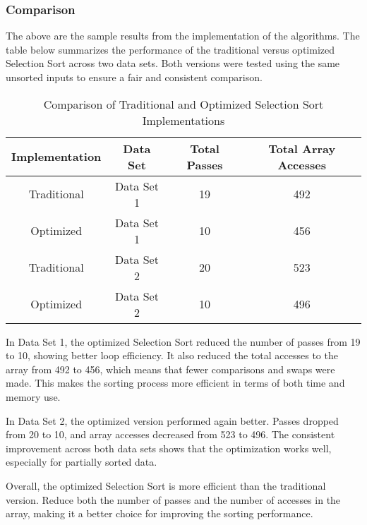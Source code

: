 \subsubsection{Comparison}


The above are the sample results from the implementation of the algorithms. The table below summarizes the performance of the traditional versus optimized Selection Sort across two data sets. Both versions were tested using the same unsorted inputs to ensure a fair and consistent comparison.

\begin{table}[h]
    \centering
    \caption{Comparison of Traditional and Optimized Selection Sort Implementations}
    \begin{tabular}{|c|c|c|c|}
        \hline
        \textbf{Implementation} & \textbf{Data Set} & \textbf{Total Passes} & \textbf{Total Array Accesses} \\
        \hline
        Traditional & Data Set 1 & 19 & 492 \\
        Optimized   & Data Set 1 & 10 & 456 \\
        \hline
        Traditional & Data Set 2 & 20 & 523 \\
        Optimized   & Data Set 2 & 10  & 496 \\
        \hline
    \end{tabular}
    \label{tab:sort_comparison}
\end{table}

In Data Set 1, the optimized Selection Sort reduced the number of passes from 19 to 10, showing better loop efficiency. It also reduced the total accesses to the array from 492 to 456, which means that fewer comparisons and swaps were made. This makes the sorting process more efficient in terms of both time and memory use.

In Data Set 2, the optimized version performed again better. Passes dropped from 20 to 10, and array accesses decreased from 523 to 496. The consistent improvement across both data sets shows that the optimization works well, especially for partially sorted data.

Overall, the optimized Selection Sort is more efficient than the traditional version. Reduce both the number of passes and the number of accesses in the array, making it a better choice for improving the sorting performance.